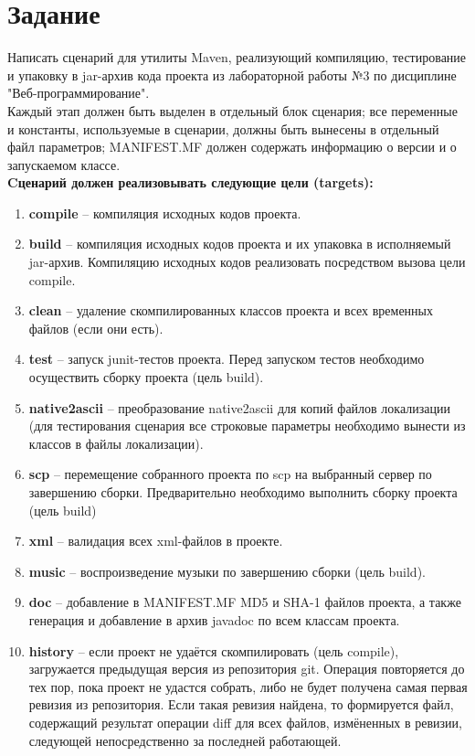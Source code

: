 \documentclass[12pt,a4paper]{article}
\begin{document}
\section*{Задание}
Написать сценарий для утилиты Maven, реализующий компиляцию, тестирование и упаковку в jar-архив кода проекта из лабораторной работы №3 по дисциплине "Веб-программирование".\\
\hfill\break
Каждый этап должен быть выделен в отдельный блок сценария; все переменные и константы, используемые в сценарии, должны быть вынесены в отдельный файл параметров; MANIFEST.MF должен содержать информацию о версии и о запускаемом классе. \\
\hfill\break
\textbf{Cценарий должен реализовывать следующие цели (targets):}\\
\hfill\break
\begin{enumerate}
    \item \textbf{compile} -- компиляция исходных кодов проекта.
    \item \textbf{build} -- компиляция исходных кодов проекта и их упаковка в исполняемый jar-архив. Компиляцию исходных кодов реализовать посредством вызова цели compile.
    \item \textbf{clean} -- удаление скомпилированных классов проекта и всех временных файлов (если они есть).
    \item \textbf{test} -- запуск junit-тестов проекта. Перед запуском тестов необходимо осуществить сборку проекта (цель build).
    \item \textbf{native2ascii} -- преобразование native2ascii для копий файлов локализации (для тестирования сценария все строковые параметры необходимо вынести из классов в файлы локализации).
    \item \textbf{scp} -- перемещение собранного проекта по scp на выбранный сервер по завершению сборки. Предварительно необходимо выполнить сборку проекта (цель build)
    \item \textbf{xml} -- валидация всех xml-файлов в проекте.
    \item \textbf{music} -- воспроизведение музыки по завершению сборки (цель build).
    \item \textbf{doc} -- добавление в MANIFEST.MF MD5 и SHA-1 файлов проекта, а также генерация и добавление в архив javadoc по всем классам проекта.
    \item \textbf{history} -- если проект не удаётся скомпилировать (цель compile), загружается предыдущая версия из репозитория git. Операция повторяется до тех пор, пока проект не удастся собрать, либо не будет получена самая первая ревизия из репозитория. Если такая ревизия найдена, то формируется файл, содержащий результат операции diff для всех файлов, измёненных в ревизии, следующей непосредственно за последней работающей.

\end{enumerate}
\end{document}
